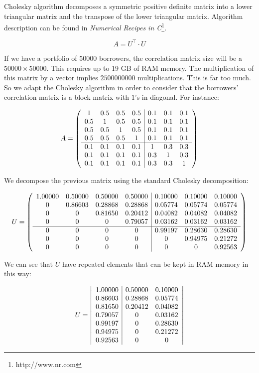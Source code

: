 \documentclass[a4paper,12pt,final]{article}
\begin{document}
Cholesky algorithm decomposes a symmetric positive definite matrix into a lower
triangular matrix and the transpose of the lower triangular matrix. Algorithm 
description can be found in \emph{Numerical Recipes in C}\footnote{http://www.nr.com}.

\begin{displaymath}
A = U^{\top} \cdot U
\end{displaymath}

If we have a portfolio of $50000$ borrowers, the correlation matrix size will
be a $50000 \times 50000$. This requires up to 19 GB of RAM memory. The 
multiplication of this matrix by a vector implies $2500000000$ multiplications.
This is far too much. So we adapt the Cholesky algorithm in order to consider that 
the borrowers' correlation matrix is a block matrix with $1$'s in diagonal. 
For instance:

\begin{displaymath}
A = \left(
\begin{array}{cccc|ccc}
1   & 0.5 & 0.5 & 0.5 & 0.1 & 0.1 & 0.1 \cr
0.5 & 1   & 0.5 & 0.5 & 0.1 & 0.1 & 0.1 \cr
0.5 & 0.5 & 1   & 0.5 & 0.1 & 0.1 & 0.1 \cr
0.5 & 0.5 & 0.5 & 1   & 0.1 & 0.1 & 0.1 \cr
\hline
0.1 & 0.1 & 0.1 & 0.1 & 1   & 0.3 & 0.3 \cr
0.1 & 0.1 & 0.1 & 0.1 & 0.3 & 1   & 0.3 \cr
0.1 & 0.1 & 0.1 & 0.1 & 0.3 & 0.3 & 1
\end{array}
\right)
\end{displaymath}

We decompose the previous matrix using the standard Cholesky decomposition:

\begin{displaymath}
U = \left(
\begin{array}{cccc|ccc}
 1.00000 & 0.50000 & 0.50000 & 0.50000 & 0.10000 & 0.10000 & 0.10000 \cr
 0       & 0.86603 & 0.28868 & 0.28868 & 0.05774 & 0.05774 & 0.05774 \cr
 0       & 0       & 0.81650 & 0.20412 & 0.04082 & 0.04082 & 0.04082 \cr
 0       & 0       & 0       & 0.79057 & 0.03162 & 0.03162 & 0.03162 \cr
\hline
 0       & 0       & 0       & 0       & 0.99197 & 0.28630 & 0.28630 \cr
 0       & 0       & 0       & 0       & 0       & 0.94975 & 0.21272 \cr
 0       & 0       & 0       & 0       & 0       & 0       & 0.92563
\end{array}
\right)
\end{displaymath}

We can see that $U$ have repeated elements that can be kept in RAM memory in 
this way:

\begin{displaymath}
U = \left|
\begin{array}{c|cc}
 1.00000 & 0.50000 & 0.10000 \cr
 0.86603 & 0.28868 & 0.05774 \cr
 0.81650 & 0.20412 & 0.04082 \cr
 0.79057 & 0       & 0.03162 \cr
 0.99197 & 0       & 0.28630 \cr
 0.94975 & 0       & 0.21272 \cr
 0.92563 & 0       & 0
\end{array}
\right|
\end{displaymath}
\end{document}
